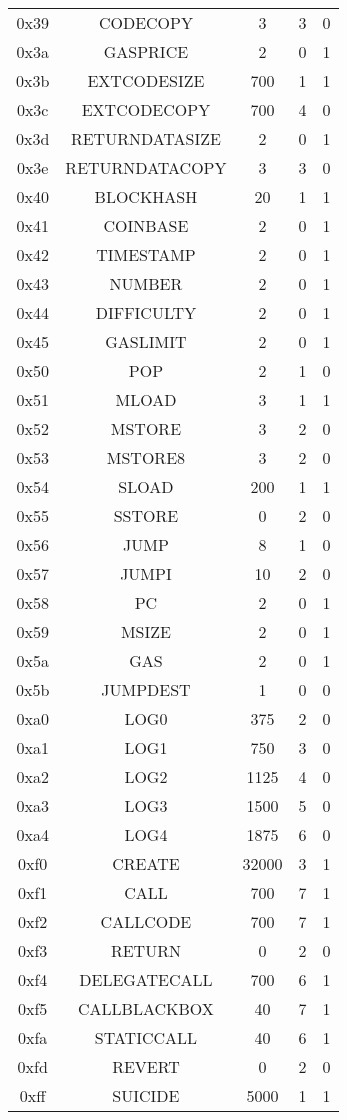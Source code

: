 \documentclass[10pt,a4paper,leqno,bibliography=totoc]{scrartcl}
\newenvironment{alphafootnotes}
{\par\edef\savedfootnotenumber{\number\value{footnote}}
\renewcommand{\thefootnote}{\alph{footnote}}
\setcounter{footnote}{0}}
{\par\setcounter{footnote}{\savedfootnotenumber}}
\begin{document}
\begin{alphafootnotes}
{\begin{longtable}{|ccccc|}
0x39 & CODECOPY & 3 & 3 & 0 \\
0x3a & GASPRICE & 2 & 0 & 1 \\
0x3b & EXTCODESIZE & 700 & 1 & 1 \\
0x3c & EXTCODECOPY & 700 & 4 & 0 \\
0x3d & RETURNDATASIZE & 2 & 0 & 1 \\
0x3e & RETURNDATACOPY & 3 & 3 & 0 \\
0x40 & BLOCKHASH & 20 & 1 & 1 \\
0x41 & COINBASE & 2 & 0 & 1 \\
0x42 & TIMESTAMP & 2 & 0 & 1 \\
0x43 & NUMBER & 2  & 0 & 1 \\
0x44 & DIFFICULTY & 2 & 0 & 1 \\
0x45 & GASLIMIT & 2  & 0 & 1 \\
0x50 & POP & 2 & 1 & 0 \\
0x51 & MLOAD & 3 & 1 & 1 \\
0x52 & MSTORE & 3 & 2 & 0 \\
0x53 & MSTORE8 & 3 & 2 & 0 \\
0x54 & SLOAD & 200 & 1 & 1 \\
0x55 & SSTORE & 0 & 2 & 0 \\
0x56 & JUMP & 8 & 1 & 0 \\
0x57 & JUMPI & 10 & 2 & 0 \\
0x58 & PC & 2 & 0 & 1 \\
0x59 & MSIZE & 2 & 0 & 1 \\
0x5a & GAS & 2 & 0 & 1 \\
0x5b & JUMPDEST & 1 & 0 & 0 \\
0xa0 & LOG0 & 375 & 2 & 0 \\
0xa1 & LOG1 & 750 & 3 & 0 \\
0xa2 & LOG2 & 1125 & 4 & 0 \\
0xa3 & LOG3 & 1500 & 5 & 0 \\
0xa4 & LOG4 & 1875 & 6 & 0 \\
0xf0 & CREATE & 32000 & 3 & 1 \\
0xf1 & CALL & 700 & 7 & 1 \\
0xf2 & CALLCODE & 700 & 7 & 1 \\
0xf3 & RETURN & 0 & 2 & 0 \\
0xf4 & DELEGATECALL & 700 & 6 & 1 \\
0xf5 & CALLBLACKBOX & 40 & 7 & 1 \\
0xfa & STATICCALL & 40 & 6 & 1 \\
0xfd & REVERT & 0 & 2 & 0 \\
0xff & SUICIDE & 5000 & 1 & 1 \\
\hline
\end{longtable}
}


\clearpage
\begin{multicols*}{2}
\printbibliography
\clearpage
\printglossary[type=\acronymtype]
\glsaddall
\printnoidxglossaries
\clearpage
\end{multicols*}
\end{alphafootnotes}

\printindex
\end{document}

